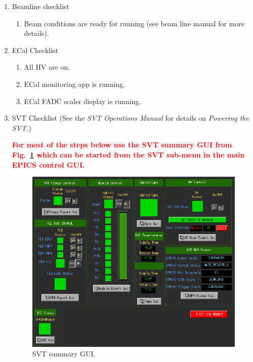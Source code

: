 \documentclass[12pt]{article}
\begin{document}
\begin{enumerate}
\item
Beamline checklist
\begin{enumerate}
\item
Beam conditions are ready for running (see beam line manual for more details).
\end{enumerate}
\item    ECal Checklist
\begin{enumerate}
\item
All HV are on.
\item
ECal monitoring app is running.
\item
ECal FADC scaler display is running.
\end{enumerate}
\item
\label{item:svt-checklist}
SVT Checklist (See the \textit{SVT Operations Manual} for details on \textit{Powering the SVT.})

{\bf \textcolor{red}{
For most of the steps below use the SVT summary GUI from Fig.~\ref{fig:svt_summary_gui} which can be started from the SVT sub-menu in the 
main EPICS control GUI.}}
\begin{figure}[htbp]
\begin{center}
    \includegraphics[width=\textwidth]{svt_summary_gui.png}
\caption{SVT summary GUI.}
\label{fig:svt_summary_gui}
\end{center}
\vspace*{-5mm}
\end{figure}
\begin{enumerate}


\end{enumerate}
\end{enumerate}
\end{document}
